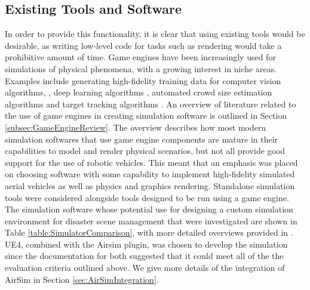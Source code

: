 \subsection{Existing Tools and Software}
In order to provide this functionality, it is clear that using existing tools would be desirable, as writing low-level code for tasks such as rendering would take a prohibitive amount of time. Game engines have been increasingly used for simulations of physical phenomena, with a growing interest in niche areas. Examples include generating high-fidelity training data for computer vision algorithms, \cite{Qiu2016UnrealCV:Engine}, deep learning algorithms \cite{Gaidon2016VirtualAnalysis}, automated crowd size estimation algorithms \cite{Lee2018DigitalCrowds} and target tracking algorithms \cite{Mueller2016ATracking}. An overview of literature related to the use of game engines in creating simulation software is outlined in Section \ref{subsec:GameEngineReview}. The overview describes how most modern simulation softwares that use game engine components are mature in their capabilities to model and render physical scenarios, but not all provide good support for the use of robotic vehicles.
This meant that an emphasis was placed on choosing software with some capability to implement high-fidelity simulated aerial vehicles as well as physics and graphics rendering.
Standalone simulation tools were considered alongside tools designed to be run using a game engine. The simulation software whose potential use for designing a custom simulation environment for disaster scene management that were investigated are shown in Table \ref{table:SimulatorComparison}, with more detailed overviews provided in \cite{Ebeid2018ASimulators}. UE4, combined with the Airsim plugin, was chosen to develop the simulation since the documentation for both suggested that it could meet all of the the evaluation criteria outlined above. We give more details of the integration of AirSim in Section \ref{sec:AirSimIntegration}.\par
